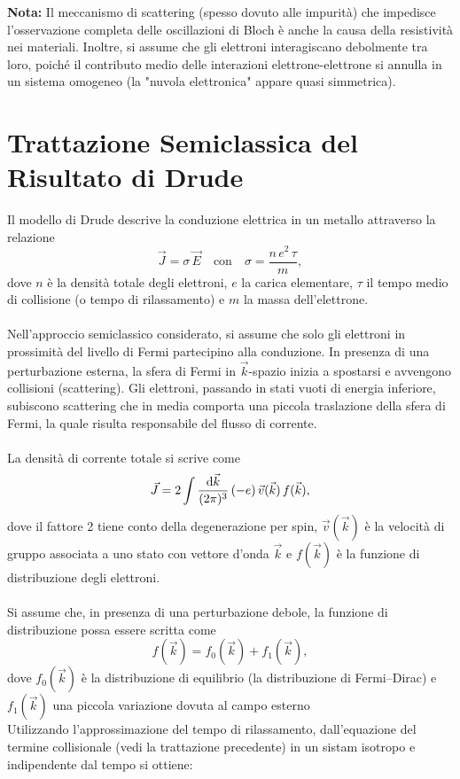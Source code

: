 \bigskip
\noindent \textbf{Nota:} Il meccanismo di scattering (spesso dovuto alle impurità) che impedisce l'osservazione completa delle oscillazioni di Bloch è anche la causa della resistività nei materiali. Inoltre, si assume che gli elettroni interagiscano debolmente tra loro, poiché il contributo medio delle interazioni elettrone-elettrone si annulla in un sistema omogeneo (la "nuvola elettronica" appare quasi simmetrica).

\section{Trattazione Semiclassica del Risultato di Drude}
Il modello di Drude descrive la conduzione elettrica in un metallo attraverso la relazione
\[
\vec{J} = \sigma\, \vec{E} \quad \text{con} \quad \sigma = \frac{n\,e^2\,\tau}{m},
\]
dove \(n\) è la densità totale degli elettroni, \(e\) la carica elementare, \(\tau\) il tempo medio di collisione (o tempo di rilassamento) e \(m\) la massa dell'elettrone.\\\\
Nell'approccio semiclassico considerato, si assume che solo gli elettroni in prossimità del livello di Fermi partecipino alla conduzione. In presenza di una perturbazione esterna, la sfera di Fermi in \(\vec{k}\)-spazio inizia a spostarsi e avvengono collisioni (scattering). Gli elettroni, passando in stati vuoti di energia inferiore, subiscono scattering che in media comporta una piccola traslazione della sfera di Fermi, la quale risulta responsabile del flusso di corrente.\\\\
La densità di corrente totale si scrive come
\begin{equation}
    \vec{J} = 2 \int \frac{\text{d}\vec{k}}{(2\pi)^3}\, (-e)\,\vec{v}(\vec{k})\, f(\vec{k}),
\end{equation}
dove il fattore 2 tiene conto della degenerazione per spin, \(\vec{v}(\vec{k})\) è la velocità di gruppo associata a uno stato con vettore d'onda \(\vec{k}\) e \(f(\vec{k})\) è la funzione di distribuzione degli elettroni.\\\\
Si assume che, in presenza di una perturbazione debole, la funzione di distribuzione possa essere scritta come
\[
f(\vec{k}) = f_0(\vec{k}) + f_1(\vec{k}),
\]
dove \(f_0(\vec{k})\) è la distribuzione di equilibrio (la distribuzione di Fermi–Dirac) e \(f_1(\vec{k})\) una piccola variazione dovuta al campo esterno\\
Utilizzando l'approssimazione del tempo di rilassamento, dall'equazione del termine collisionale (vedi la trattazione precedente) in un sistam isotropo e indipendente dal tempo si ottiene:
